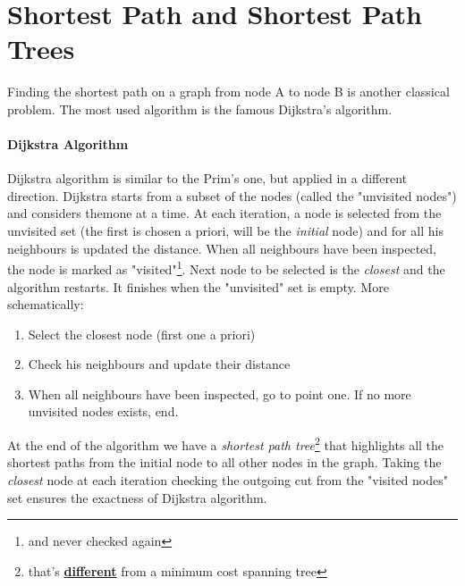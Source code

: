     \section{Shortest Path and Shortest Path Trees}
        Finding the shortest path on a graph from node A to node B is another classical problem. The most used algorithm is the famous Dijkstra's algorithm.

        \paragraph{Dijkstra Algorithm}
            Dijkstra algorithm is similar to the Prim's one, but applied in a different direction. Dijkstra starts from a subset of the nodes (called the "unvisited nodes") and considers themone at a time. At each iteration, a node is selected from the unvisited set (the first is chosen a priori, will be the \textit{initial} node) and for all his neighbours is updated the distance. When all neighbours have been inspected, the node is marked as "visited"\footnote{and never checked again}. Next node to be selected is the \textit{closest} and the algorithm restarts. It finishes when the "unvisited" set is empty. More schematically:
            \begin{enumerate}
                \item Select the closest node (first one a priori)
                \item Check his neighbours and update their distance
                \item When all neighbours have been inspected, go to point one. If no more unvisited nodes exists, end.
            \end{enumerate}
            At the end of the algorithm we have a \textit{shortest path tree}\footnote{that's \underline{\textbf{different}} from a minimum cost spanning tree} that highlights all the shortest paths from the initial node to all other nodes in the graph. Taking the \textit{closest} node at each iteration checking the outgoing cut from the "visited nodes" set ensures the exactness of Dijkstra algorithm.

